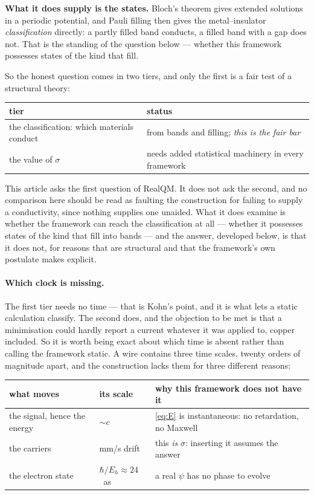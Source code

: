\documentclass[11pt]{article}
\begin{document}
\textbf{What it does supply is the states.} Bloch's theorem gives extended solutions in a periodic
potential, and Pauli filling then gives the metal--insulator \emph{classification} directly: a
partly filled band conducts, a filled band with a gap does not. That is the standing of the question
below --- whether this framework possesses states of the kind that fill.

So the honest question comes in two tiers, and only the first is a fair test of a structural theory:

\begin{center}
\small
\begin{tabular}{@{}ll@{}}
\toprule
tier & status\\
\midrule
the classification: which materials conduct & from bands and filling; \emph{this is the fair bar}\\
the value of $\sigma$ & needs added statistical machinery in every framework\\
\bottomrule
\end{tabular}
\end{center}

\noindent This article asks the first question of RealQM. It does not ask the second, and no
comparison here should be read as faulting the construction for failing to supply a conductivity,
since nothing supplies one unaided. What it does examine is whether the framework can reach the
classification at all --- whether it possesses states of the kind that fill into bands --- and the
answer, developed below, is that it does not, for reasons that are structural and that the
framework's own postulate makes explicit.

\paragraph{Which clock is missing.} The first tier needs no time --- that is Kohn's point, and it is
what lets a static calculation classify. The second does, and the objection to be met is that a
minimisation could hardly report a current whatever it was applied to, copper included. So it is
worth being exact about which time is absent rather than calling the framework static. A wire
contains three time scales, twenty orders of magnitude apart, and the construction lacks them for
three different reasons:

\begin{center}
\small
\begin{tabular}{@{}lll@{}}
\toprule
what moves & its scale & why this framework does not have it\\
\midrule
the signal, hence the energy & $\sim c$ & \eqref{eq:E} is instantaneous: no retardation, no Maxwell\\
the carriers & mm/s drift & this \emph{is} $\sigma$: inserting it assumes the answer\\
the electron state & $\hbar/E_h\approx24$~as & a real $\psi$ has no phase to evolve\\
\bottomrule
\end{tabular}
\end{center}
\end{document}

